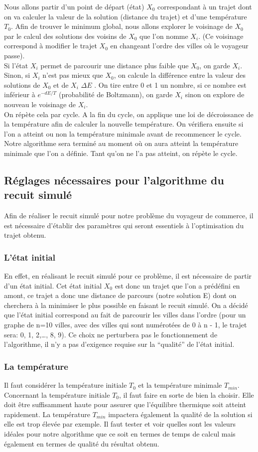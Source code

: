 \documentclass{article}
\begin{document}
Nous allons partir d’un point de départ (état) \(X_0\) correspondant à un trajet dont on va calculer la valeur de la solution (distance du trajet) et d’une température \(T_0\). Afin de trouver le minimum global, nous allons explorer le voisinage de \(X_0\) par le calcul des solutions des voisins de \(X_0\) que l’on nomme \(X_i\). (Ce voisinage correspond à modifier le trajet \(X_0\) en changeant l’ordre des villes où le voyageur passe).\\
Si l’état \(X_i\) permet de parcourir une distance plus faible que \(X_0\), on garde \(X_i\). Sinon, si \(X_i\) n’est pas mieux que \(X_0\), on calcule la différence entre la valeur des solutions de \(X_0\) et de \(X_i\) \(\Delta{E}\) . On tire entre 0 et 1 un nombre, si ce nombre est inférieur à \(e^{-dE/T}\)  (probabilité de Boltzmann), on garde \(X_i\) sinon on explore de nouveau le voisinage de \(X_i\).\\
On répète cela par cycle. A la fin du cycle, on applique une loi de décroissance de la température afin de calculer la nouvelle température. On vérifiera ensuite si l’on a atteint ou non la température minimale avant de recommencer le cycle. Notre algorithme sera terminé au moment où on aura atteint la température minimale que l’on a définie. Tant qu’on ne l’a pas atteint, on répète le cycle. 
\subsection{Réglages nécessaires pour l'algorithme du recuit simulé}
Afin de réaliser le recuit simulé pour notre problème du voyageur de commerce, il est nécessaire d’établir des paramètres qui seront essentiels à l’optimisation du trajet obtenu. 
\subsubsection{L'état initial}
En effet, en réalisant le recuit simulé pour ce problème, il est nécessaire de partir d’un état initial. Cet état initial \(X_0\) est donc un trajet que l’on a prédéfini en amont, ce trajet a donc une distance de parcours (notre solution E) dont on cherchera à la minimiser le plus possible en faisant le recuit simulé. On a décidé que l’état initial correspond au fait de parcourir les villes dans l’ordre (pour un graphe de n=10 villes, avec des villes qui sont numérotées de 0 à n - 1, le trajet sera: 0, 1, 2,…, 8, 9). Ce choix ne perturbera pas le fonctionnement de l’algorithme, il n’y a pas d’exigence requise sur la “qualité” de l’état initial. 
\subsubsection{La température}
Il faut considérer la température initiale \(T_0\) et la température minimale \(T_{min}\). Concernant la température initiale \(T_0\), il faut faire en sorte de bien la choisir. Elle doit être suffisamment haute pour assurer que l’équilibre thermique soit atteint rapidement. La température \(T_{min}\) impactera également la qualité de la solution si elle est trop élevée par exemple. Il faut tester et voir quelles sont les valeurs idéales pour notre algorithme que ce soit en termes de temps de calcul mais également en termes de qualité du résultat obtenu.
\end{document}
